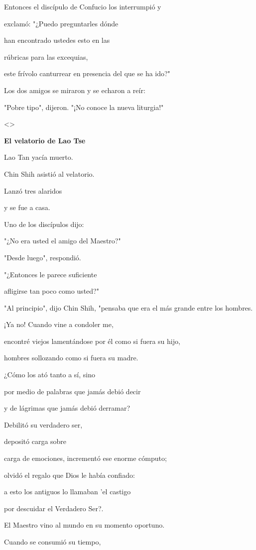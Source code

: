 Entonces el discípulo de Confucio los interrumpió y

exclamó: "¿Puedo preguntarles dónde

han encontrado ustedes esto en las

rúbricas para las excequias,

este frívolo canturrear en presencia del que se ha ido?"

Los dos amigos se miraron y se echaron a reír:

"Pobre tipo", dijeron. "¡No conoce la nueva liturgia!"

\textless\textgreater{}

\textbf{{El velatorio de Lao Tse}}

Lao Tan yacía muerto.

Chin Shih asistió al velatorio.

Lanzó tres alaridos

y se fue a casa.

Uno de los discípulos dijo:

"¿No era usted el amigo del Maestro?"

"Desde luego", respondió.

"¿Entonces le parece suficiente

afligirse tan poco como usted?"

"Al principio", dijo Chin Shih, "pensaba que era el más grande entre los
hombres.

¡Ya no! Cuando vine a condoler me,

encontré viejos lamentándose por él como si fuera su hijo,

hombres sollozando como si fuera su madre.

¿Cómo los ató tanto a sí, sino

por medio de palabras que jamás debió decir

y de lágrimas que jamás debió derramar?

Debilitó su verdadero ser,

depositó carga sobre

carga de emociones, incrementó ese enorme cómputo;

olvidó el regalo que Dios le había confiado:

a esto los antiguos lo llamaban 'el castigo

por descuidar el Verdadero Ser?.

El Maestro vino al mundo en su momento oportuno.

Cuando se consumió su tiempo,

